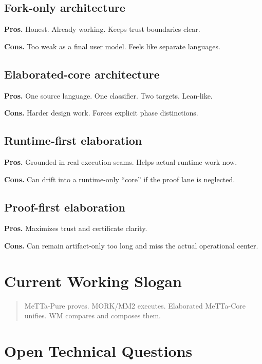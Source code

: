 \documentclass[11pt]{article}
\theoremstyle{remark}
\newcommand{\MeTTa}{\textup{MeTTa}}
\newcommand{\MORK}{\textup{MORK}}
\begin{document}
\subsection{Fork-only architecture}

\textbf{Pros.}
Honest. Already working. Keeps trust boundaries clear.

\textbf{Cons.}
Too weak as a final user model. Feels like separate languages.

\subsection{Elaborated-core architecture}

\textbf{Pros.}
One source language. One classifier. Two targets. Lean-like.

\textbf{Cons.}
Harder design work. Forces explicit phase distinctions.

\subsection{Runtime-first elaboration}

\textbf{Pros.}
Grounded in real execution seams. Helps actual runtime work now.

\textbf{Cons.}
Can drift into a runtime-only ``core'' if the proof lane is neglected.

\subsection{Proof-first elaboration}

\textbf{Pros.}
Maximizes trust and certificate clarity.

\textbf{Cons.}
Can remain artifact-only too long and miss the actual operational center.

\section{Current Working Slogan}

\begin{quote}
\MeTTa-Pure proves. \MORK{}/MM2 executes. Elaborated \MeTTa-Core unifies.
WM compares and composes them.
\end{quote}

\section{Open Technical Questions}
\end{document}
